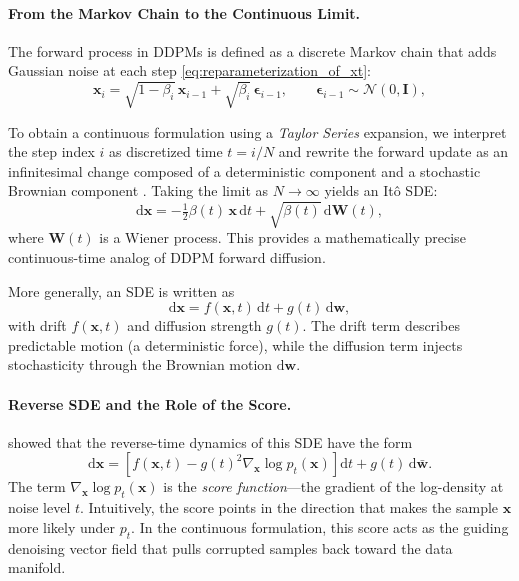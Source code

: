 \paragraph{From the Markov Chain to the Continuous Limit.}
The forward process in DDPMs is defined as a discrete Markov chain that adds Gaussian noise at each
step \eqref{eq:reparameterization_of_xt}:
\begin{equation}
\mathbf{x}_i = \sqrt{1 - \beta_i}\,\mathbf{x}_{i-1}
    + \sqrt{\beta_i}\,\boldsymbol{\epsilon}_{i-1},
\qquad
\boldsymbol{\epsilon}_{i-1} \sim \mathcal{N}(0,\mathbf{I}),
\end{equation}

To obtain a continuous formulation using a \emph{Taylor Series} expansion, we interpret the step index $i$ as discretized time
$t = i / N$ and rewrite the forward update as an infinitesimal change composed of a deterministic
component and a stochastic Brownian component \citep{song2021scorebased}. Taking the limit as $N \to \infty$ yields an Itô SDE:
\begin{equation}
\mathrm{d}\mathbf{x}
=
-\tfrac{1}{2}\beta(t)\,\mathbf{x}\,\mathrm{d}t
+
\sqrt{\beta(t)}\,\mathrm{d}\mathbf{W}(t),
\end{equation}
where $\mathbf{W}(t)$ is a Wiener process. This provides a mathematically precise continuous-time
analog of DDPM forward diffusion.

More generally, an SDE is written as
\begin{equation}
\mathrm{d}\mathbf{x}
=
f(\mathbf{x},t)\,\mathrm{d}t
+
g(t)\,\mathrm{d}\mathbf{w},
\end{equation}
with drift $f(\mathbf{x},t)$ and diffusion strength $g(t)$. The drift term describes predictable
motion (a deterministic force), while the diffusion term injects stochasticity through the Brownian
motion $\mathrm{d}\mathbf{w}$.

\paragraph{Reverse SDE and the Role of the Score.}
\citet{song2021scorebased} showed that the reverse-time dynamics of this SDE have the form
\begin{equation}
\mathrm{d}\mathbf{x}
=
\left[
    f(\mathbf{x},t)
    -
    g(t)^2 \nabla_{\mathbf{x}} \log p_t(\mathbf{x})
\right]
\mathrm{d}t
+
g(t)\,\mathrm{d}\bar{\mathbf{w}}.
\end{equation}
The term
\(
\nabla_{\mathbf{x}} \log p_t(\mathbf{x})
\)
is the \emph{score function}—the gradient of the log-density at noise level $t$. Intuitively, the
score points in the direction that makes the sample $\mathbf{x}$ more likely under $p_t$. In the
continuous formulation, this score acts as the guiding denoising vector field that pulls corrupted
samples back toward the data manifold.


